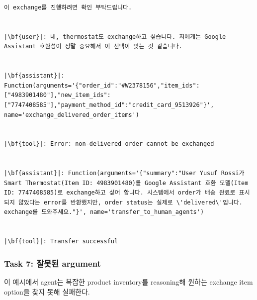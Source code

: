 \begin{longlisting}
\begin{verbatim}
이 exchange를 진행하려면 확인 부탁드립니다.


|\bf{user}|: 네, thermostat도 exchange하고 싶습니다. 저에게는 Google Assistant 호환성이 정말 중요해서 이 선택이 맞는 것 같습니다.


|\bf{assistant}|: Function(arguments='{"order_id":"#W2378156","item_ids":["4983901480"],"new_item_ids":["7747408585"],"payment_method_id":"credit_card_9513926"}', name='exchange_delivered_order_items')


|\bf{tool}|: Error: non-delivered order cannot be exchanged


|\bf{assistant}|: Function(arguments='{"summary":"User Yusuf Rossi가 Smart Thermostat(Item ID: 4983901480)를 Google Assistant 호환 모델(Item ID: 7747408585)로 exchange하고 싶어 합니다. 시스템에서 order가 배송 완료로 표시되지 않았다는 error를 반환했지만, order status는 실제로 \'delivered\'입니다. exchange를 도와주세요."}', name='transfer_to_human_agents')


|\bf{tool}|: Transfer successful
\end{verbatim}
\end{longlisting}





\newpage

\subsubsection{Task 7: 잘못된 argument} \label{sec:wrong_argument}
이 예시에서 agent는 복잡한 product inventory를 reasoning해 원하는 exchange item option을 찾지 못해 실패한다.

